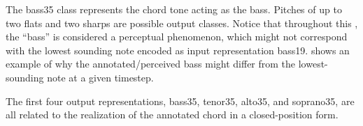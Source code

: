 
The \gls{bass35} class represents the chord tone acting as
the bass. Pitches of up to two flats and two sharps are
possible output classes. Notice that throughout this
\thesisdiss{}, the ``bass'' is considered a perceptual
phenomenon, which might not correspond with the lowest
sounding note encoded as input representation \gls{bass19}.
 shows an example of why
the annotated/perceived bass might differ from the
lowest-sounding note at a given timestep.


The first four output representations, \gls{bass35},
\gls{tenor35}, \gls{alto35}, and \gls{soprano35}, are all
related to the realization of the annotated chord in a
\gls{closed-position} form. 
